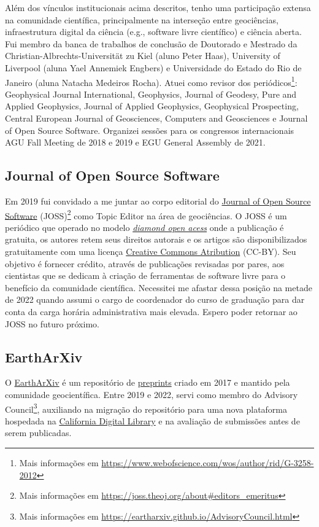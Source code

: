 \documentclass[10pt,a4paper,oneside]{book}
\newcommand{\ResearcherID}{G-3258-2012}
\newcommand{\UERJ}{Universidade do Estado do Rio de Janeiro}
\begin{document}
Além dos vínculos institucionais acima descritos, tenho uma participação
extensa na comunidade científica, principalmente na interseção entre
geociências, infraestrutura digital da ciência (e.g., software livre
científico) e ciência aberta.
Fui membro da banca de trabalhos de conclusão de Doutorado e Mestrado da
Christian-Albrechts-Universität zu Kiel (aluno Peter Haas),
University of Liverpool (aluna Yael Annemiek Engbers)
e \UERJ{} (aluna Natacha Medeiros Rocha).
Atuei como revisor dos periódicos\footnote{Mais informações em \url{https://www.webofscience.com/wos/author/rid/\ResearcherID}}:
Geophysical Journal International,
Geophysics,
Journal of Geodesy,
Pure and Applied Geophysics,
Journal of Applied Geophysics,
Geophysical Prospecting,
Central European Journal of Geosciences,
Computers and Geosciences
e
Journal of Open Source Software.
Organizei sessões para os congressos internacionais AGU Fall Meeting de 2018 e
2019 e EGU General Assembly de 2021.

\subsection{Journal of Open Source Software}

Em 2019 fui convidado a me juntar ao corpo editorial do
\href{https://joss.theoj.org/}{Journal of Open Source Software}
(JOSS)\footnote{Mais informações em \url{https://joss.theoj.org/about\#editors\_emeritus}}
como Topic Editor na área de geociências.
O JOSS é um periódico que operado no modelo
\href{https://en.wikipedia.org/wiki/Diamond_open_access}{\textit{diamond open acess}}
onde a publicação é gratuita, os autores retem seus direitos autorais e os
artigos são disponibilizados gratuitamente com uma licença
\href{https://creativecommons.org/licenses/by/4.0/}{Creative Commons Atribution} (CC-BY).
Seu objetivo é fornecer crédito, através de publicações revisadas por pares,
aos cientistas que se dedicam à criação de ferramentas de software livre para
o benefício da comunidade científica.
Necessitei me afastar dessa posição na metade de 2022 quando assumi o cargo
de coordenador do curso de graduação para dar conta da carga horária
administrativa mais elevada.
Espero poder retornar ao JOSS no futuro próximo.

\subsection{EarthArXiv}

O \href{https://eartharxiv.org/}{EarthArXiv} é um repositório de
\href{https://en.wikipedia.org/wiki/Preprint}{preprints} criado em 2017 e
mantido pela comunidade geocientífica.
Entre 2019 e 2022, servi como membro do
Advisory Council\footnote{Mais informações em \url{https://eartharxiv.github.io/AdvisoryCouncil.html}},
auxiliando na migração do repositório para uma nova plataforma hospedada na
\href{https://cdlib.org/}{California Digital Library} e na avaliação de
submissões antes de serem publicadas.
\end{document}
